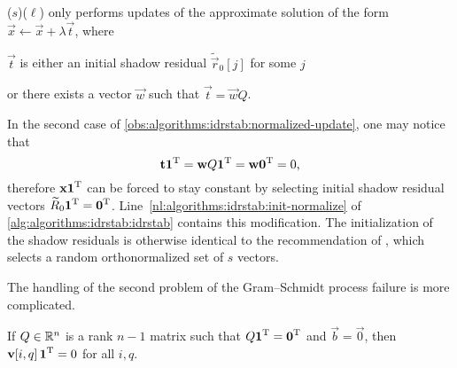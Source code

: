 \begin{obs}
  \label{obs:algorithms:idrstab:normalized-update}
  ($s$)($\ell$) only performs updates
  of the approximate solution of the form $\vec{x} \gets \vec{x} +
  \lambda \vec{t}$, where
  \begin{asparaenum}
  \item $\vec{t}$ is either an initial shadow
    residual $\tilde{\vec{r}}_0[j]$ for some $j$
  \item or there exists a vector $\vec{w}$ such that
    $\vec{t} = \vec{w} Q$.
  \end{asparaenum}
\end{obs}

In the second case of \cref{obs:algorithms:idrstab:normalized-update},
one may notice that
\begin{equation}
  \bm{\mathrm{t}} \bm{\mathrm{1}}^{\mathrm{T}} = \bm{\mathrm{w}} Q \bm{\mathrm{1}}^{\mathrm{T}} = \bm{\mathrm{w}} \bm{\mathrm{0}}^{\mathrm{T}} = 0
  \text,
\end{equation}
therefore $\bm{\mathrm{x}} \bm{\mathrm{1}}^{\mathrm{T}}$ can be forced to stay constant by
selecting initial shadow residual vectors
$\widetilde{R}_0 \bm{\mathrm{1}}^{\mathrm{T}} =
\bm{\mathrm{0}}^{\mathrm{T}}$.
Line~\ref{nl:algorithms:idrstab:init-normalize} of
\cref{alg:algorithms:idrstab:idrstab} contains this modification. The
initialization of the shadow residuals is otherwise identical to the
recommendation of \citet{sonneveld2010convergence}, which selects a
random orthonormalized set of $s$ vectors.

The handling of the second problem of the Gram--Schmidt process
failure is more complicated.

\begin{obs}
  \label{obs:algorithms:idrstab:normalized-v}
  If $Q \in \mathbb{R}^n$ is a rank $n - 1$ matrix such that
  $Q \bm{\mathrm{1}}^{\mathrm{T}} = \bm{\mathrm{0}}^{\mathrm{T}}$ and $\vec{b} = \vec{0}$, then
  $\bm{\mathrm{v}}[i, q] \, \bm{\mathrm{1}}^{\mathrm{T}} = 0$ for all $i, q$.
\end{obs}


